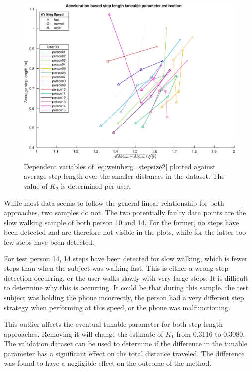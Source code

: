\begin{figure}[h]
	\centering
	\includegraphics[width=0.8\linewidth]{images/20201128_1317_}
	\setlength{\belowcaptionskip}{-10pt}
	\caption{Dependent variables of \eqref{eq:weinberg_stepsize2} plotted against average step length over the smaller distances in the \citet{Vezocnik2019} dataset. The value of $ K_2 $ is determined per user.}
	\label{fig:step_length_weinberg}
\end{figure}

While most data seems to follow the general linear relationship for both approaches, two samples do not. The two potentially faulty data points are the slow walking sample of both person 10 and 14. For the former, no steps have been detected and are therefore not visible in the plots, while for the latter too few steps have been detected. \par 

For test person 14, 14 steps have been detected for slow walking, which is fewer steps than when the subject was walking fast. This is either a wrong step detection occurring, or the user walks slowly with very large steps. It is difficult to determine why this is occurring. It could be that during this sample, the test subject was holding the phone incorrectly, the person had a very different step strategy when performing at this speed, or the phone was malfunctioning. \par 

This outlier affects the eventual tunable parameter for both step length approaches. Removing it will change the estimate of $K_1$ from 0.3116 to 0.3080. The validation dataset can be used to determine if the difference in the tunable parameter has a significant effect on the total distance traveled. The difference was found to have a negligible effect on the outcome of the method.

